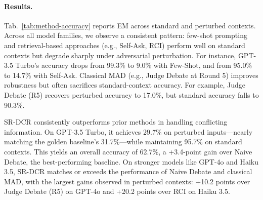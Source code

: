 \documentclass[11pt]{article}
\begin{document}





\paragraph{Results.}  Tab.~\ref{tab:method-accuracy} reports EM across standard and perturbed contexts. Across all model families, we observe a consistent pattern: few-shot prompting and retrieval-based approaches (e.g., Self-Ask, RCI) perform well on standard contexts but degrade sharply under adversarial perturbation. For instance, GPT-3.5 Turbo's accuracy drops from 99.3\% to 9.0\% with Few-Shot, and from 95.0\% to 14.7\% with Self-Ask. Classical MAD (e.g., Judge Debate at Round 5) improves robustness but often sacrifices standard-context accuracy. For example, Judge Debate (R5) recovers perturbed accuracy to 17.0\%, but standard accuracy falls to 90.3\%.

{SR-DCR} consistently outperforms prior methods in handling conflicting information. On GPT-3.5 Turbo, it achieves 29.7\% on perturbed inputs—nearly matching the golden baseline’s 31.7\%—while maintaining 95.7\% on standard contexts. This yields an overall accuracy of 62.7\%, a +3.4-point gain over Naive Debate, the best-performing baseline. On stronger models like GPT-4o and Haiku 3.5, SR-DCR matches or exceeds the performance of Naive Debate and classical MAD, with the largest gains observed in perturbed contexts: +10.2 points over Judge Debate (R5) on GPT-4o and +20.2 points over RCI on Haiku 3.5.
\end{document}
